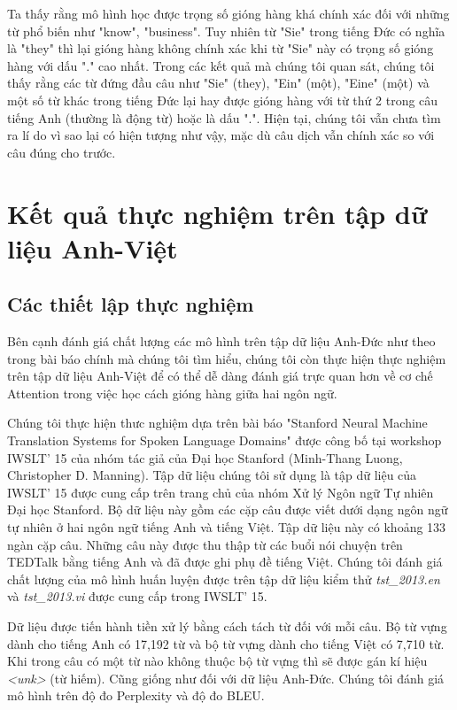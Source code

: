 Ta thấy rằng mô hình học được trọng số gióng hàng khá chính xác đối với những từ phổ biến như "know", "business". Tuy nhiên từ "Sie" trong tiếng Đức có nghĩa là "they" thì lại gióng hàng không chính xác khi từ "Sie" này có trọng số gióng hàng với dấu "." cao nhất. Trong các kết quả mà chúng tôi quan sát, chúng tôi thấy rằng các từ đứng đầu câu như "Sie" (they), "Ein" (một), "Eine" (một) và một số từ khác trong tiếng Đức lại hay được gióng hàng với từ thứ 2 trong câu tiếng Anh (thường là động từ) hoặc là dấu ".". Hiện tại, chúng tôi vẫn chưa tìm ra lí do vì sao lại có hiện tượng như vậy, mặc dù câu dịch vẫn chính xác so với câu đúng cho trước.

\section{Kết quả thực nghiệm trên tập dữ liệu Anh-Việt}
\subsection{Các thiết lập thực nghiệm}
Bên cạnh đánh giá chất lượng các mô hình trên tập dữ liệu Anh-Đức như theo trong bài báo chính mà chúng tôi tìm hiểu, chúng tôi còn thực hiện thực nghiệm trên tập dữ liệu Anh-Việt để có thể dễ dàng đánh giá trực quan hơn về cơ chế Attention trong việc học cách gióng hàng giữa hai ngôn ngữ.

Chúng tôi thực hiện thưc nghiệm dựa trên bài báo "Stanford Neural Machine Translation Systems for Spoken Language Domains" \cite{AnhVietpaper} được công bố tại workshop IWSLT' 15 của nhóm tác giả của Đại học Stanford (Minh-Thang Luong, Christopher D. Manning). Tập dữ liệu chúng tôi sử dụng là tập dữ liệu của IWSLT' 15 được cung cấp trên trang chủ của nhóm Xử lý Ngôn ngữ Tự nhiên Đại học Stanford. Bộ dữ liệu này gồm các cặp câu được viết dưới dạng ngôn ngữ tự nhiên ở hai ngôn ngữ tiếng Anh và tiếng Việt. Tập dữ liệu này có khoảng 133 ngàn cặp câu. Những câu này được thu thập từ các buổi nói chuyện trên TEDTalk bằng tiếng Anh và đã được ghi phụ đề tiếng Việt. Chúng tôi đánh giá chất lượng của mô hình huấn luyện được trên tập dữ liệu kiểm thử \textit{tst\_2013.en} và \textit{tst\_2013.vi} được cung cấp trong IWSLT' 15.

Dữ liệu được tiến hành tiền xử lý bằng cách tách từ đối với mỗi câu. Bộ từ vựng dành cho tiếng Anh có 17,192 từ và bộ từ vựng dành cho tiếng Việt có 7,710 từ. Khi trong câu có một từ nào không thuộc bộ từ vựng thì sẽ được gán kí hiệu \textit{<unk>} (từ hiếm). Cũng giống như đối với dữ liệu Anh-Đức. Chúng tôi đánh giá mô hình trên độ đo Perplexity và độ đo BLEU.

